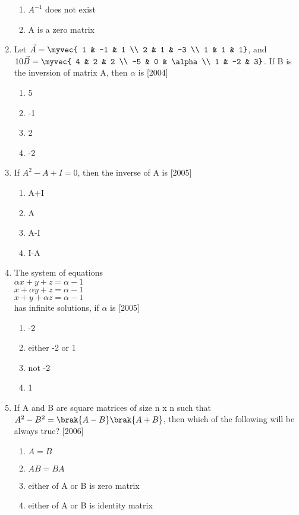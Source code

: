 \begin{enumerate}
\begin{enumerate}
			\item $A^{-1}$ does not exist
			\item A is a zero matrix
		\end{enumerate}
	\item Let $\vec{A}=\myvec{
			1 & -1 & 1 \\
			2 & 1 & -3 \\
			1 & 1 & 1}$, and $10\vec{B}=\myvec{
			4 & 2 & 2 \\
			-5 & 0 & \alpha \\
			1 & -2 & 3}$. If B is the inversion of matrix A, then $\alpha$ is \hfill{[2004]}
		\begin{enumerate}
			\item 5
			\item -1
			\item 2
			\item -2
		\end{enumerate}
	\item If $A^2-A+I=0$, then the inverse of A is \hfill{[2005]}
		\begin{enumerate}
			\item A+I
			\item A
			\item A-I
			\item I-A
		\end{enumerate}
	\item The system of equations \\
		$\alpha x+y+z = \alpha -1$ \\
		$x+ \alpha y+z = \alpha -1$ \\
		$x+y+ \alpha z = \alpha -1$ \\
		has infinite solutions, if $\alpha$ is \hfill{[2005]}
		\begin{enumerate}
			\item -2
			\item either -2 or 1
			\item not -2
			\item 1
		\end{enumerate}
	\item If A and B are square matrices of size n x n such that $A^2-B^2=\brak{A-B}\brak{A+B}$, then which of the following will be always true? \hfill{[2006]}
		\begin{enumerate}
			\item $A=B$
			\item $AB=BA$
			\item either of A or B is zero matrix
			\item either of A or B is identity matrix

\end{enumerate}
\end{enumerate}
